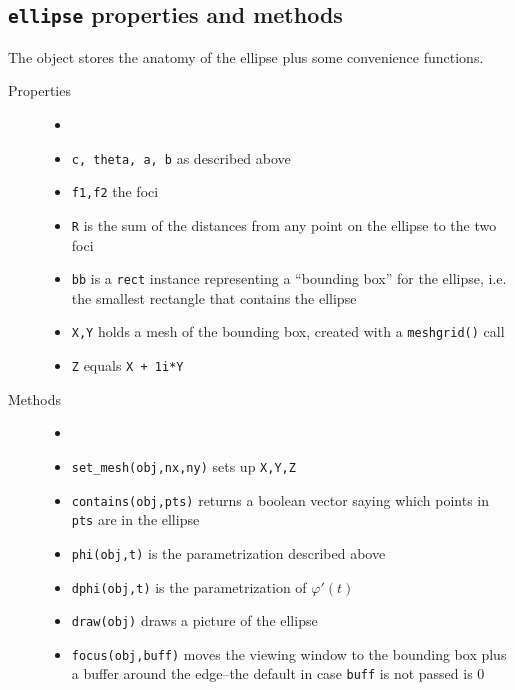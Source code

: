 \subsection{{\tt ellipse} properties and methods}

The object stores the anatomy of the ellipse plus some convenience
functions.

\begin{description}
 \item[Properties]
   \begin{itemize}
    \item[]
    \item {\tt c, theta, a, b} as described above
    \item {\tt f1,f2} the foci
    \item {\tt R} is the sum of the distances from any
          point on the ellipse to the two foci
    \item {\tt bb} is a {\tt rect} instance representing 
          a ``bounding box'' for the ellipse, i.e.
          the smallest rectangle that contains the ellipse
    \item {\tt X,Y} holds a mesh of the bounding box,
          created with a {\tt meshgrid()} call
    \item {\tt Z} equals {\tt X + 1i*Y}
   \end{itemize}
 \item[Methods]
   \begin{itemize}
    \item[]
    \item {\tt set\_mesh(obj,nx,ny)} sets up {\tt X,Y,Z}
    \item {\tt contains(obj,pts)} returns a boolean vector saying
          which points in {\tt pts} are in the ellipse
    \item {\tt phi(obj,t)} is the parametrization described above
    \item {\tt dphi(obj,t)} is the parametrization of $\varphi'(t)$
    \item {\tt draw(obj)} draws a picture of the ellipse
    \item {\tt focus(obj,buff)} moves the viewing window to the bounding
          box plus a buffer around the edge--the default in case {\tt buff}
          is not passed is 0
   \end{itemize}
\end{description}

